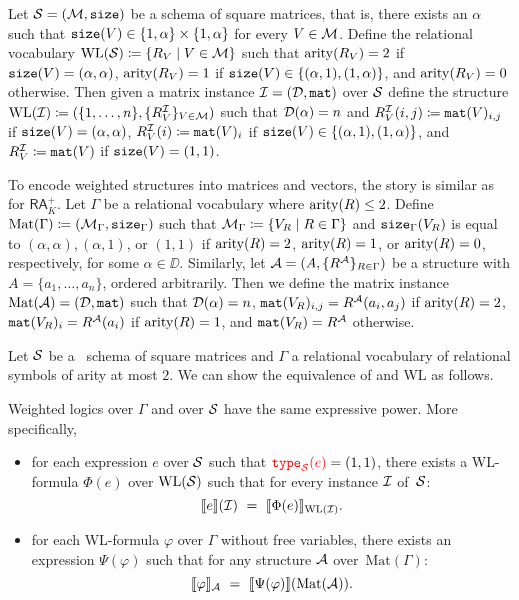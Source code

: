 Let $\mathcal{S}=(\mathcal{M},\texttt{size})$ be a schema of square matrices, that is, there exists an $\alpha$ such that $\texttt{size}(V) \in \{1, \alpha\} \times \{1,\alpha\}$ for every $V \in \mathcal{M}$.
Define the relational vocabulary $\text{WL}(\mathcal{S})\coloneqq  \{R_V \mid V \in \mathcal{M}\}$ such that $\operatorname{arity}(R_V) = 2$ if $\texttt{size}(V) = (\alpha, \alpha)$, $\operatorname{arity}(R_V) = 1$ if $\texttt{size}(V) \in \{(\alpha,1), (1,\alpha)\}$, and $\operatorname{arity}(R_V) = 0$ otherwise.
Then given a matrix instance $\mathcal{I} = (\mathcal{D},\texttt{mat})$ over $\mathcal{S}$ define the structure $\text{WL}(\mathcal{I})\coloneqq  (\{1, \ldots, n\}, \{R_V^{\mathcal{I}}\}_{V \in \mathcal{M}} )$ such that $\mathcal{D}(\alpha) = n$ and $R_V^{\mathcal{I}}(i, j)\coloneqq  \texttt{mat}(V)_{i,j}$ if $\texttt{size}(V) = (\alpha, \alpha)$, $R_V^{\mathcal{I}}(i)\coloneqq  \texttt{mat}(V)_{i}$ if $\texttt{size}(V) \in \{(\alpha,1), (1,\alpha)\}$, and $R_V^{\mathcal{I}}\coloneqq  \texttt{mat}(V)$ if $\texttt{size}(V) = (1,1)$.

To encode weighted structures into matrices and vectors, the story is similar as for $\mathsf{RA}_K^+$. Let $\Gamma$ be a relational vocabulary where $\operatorname{arity}(R) \leq 2$. 
Define $\text{Mat}(\Gamma)\coloneqq  (\mathcal{M}_\Gamma,\texttt{size}_\Gamma)$ such that $\mathcal{M}_\Gamma\coloneqq  \{ V_{R} \mid R \in \Gamma\}$ and $\texttt{size}_\Gamma(V_{R})$ is equal to $(\alpha, \alpha), (\alpha, 1)$, or $(1,1)$ if $\operatorname{arity}(R)=2$, $\operatorname{arity}(R)=1$, or $\operatorname{arity}(R)=0$, respectively, for some $\alpha \in \DD$. Similarly, let $\mathcal{A}= (A, \{R^{\mathcal{A}}\}_{R \in \Gamma})$ be a structure with $A = \{a_1, \ldots, a_n\}$, ordered arbitrarily.
Then we define the matrix instance $\text{Mat}(\mathcal{A}) = (\mathcal{D},\texttt{mat})$ such that $\mathcal{D}(\alpha) = n$, $\texttt{mat}(V_{R})_{i,j} = R^{\mathcal{A}}(a_i, a_j)$ if $\operatorname{arity}(R)=2$, $\texttt{mat}(V_{R})_{i} = R^{\mathcal{A}}(a_i)$ if $\operatorname{arity}(R)=1$, and $\texttt{mat}(V_{R}) = R^{\mathcal{A}}$ otherwise.

Let $\mathcal{S}$ be a \lang\ schema of square matrices and $\Gamma$ a relational vocabulary of relational symbols of arity at most $2$. We can show the equivalence of \langprod and WL as follows. 
\begin{proposition} \label{prop:wl}
Weighted logics over $\Gamma$ and \langprod over $\mathcal{S}$ have the same expressive power. More specifically,
\begin{itemize}
	\item for each \langprod expression $e$ over $\mathcal{S}$ such that ${\color{red} \texttt{type}_{\mathcal{S}}(e)}=(1,1)$, there exists a WL-formula $\Phi(e)$ over $\text{WL}(\mathcal{S})$ such that for every instance $\mathcal{I}$ of~$\mathcal{S}$:
	$$
	\sem{e}{\I} \ = \ \ssem{\Phi(e)}{\text{WL}(\I)}.
	$$
	\item for each WL-formula $\varphi$ over $\Gamma$ without free variables, there exists an \langprod expression $\Psi(\varphi)$ such that for any structure $\mathcal{A}$ over~$\text{Mat}(\Gamma)$:
	$$
	\ssem{\varphi}{\cA} \ = \ \sem{\Psi(\varphi)}{\text{Mat}(\cA)}.
	$$
\end{itemize}	
\end{proposition}

